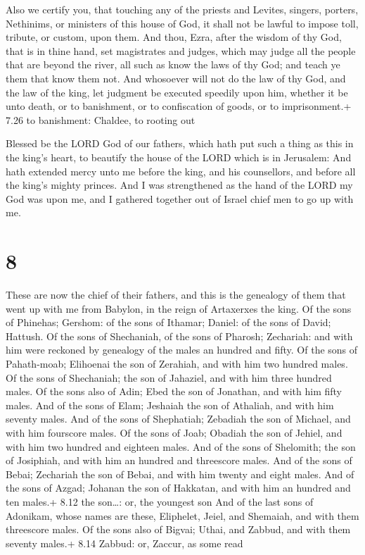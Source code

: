  Also we certify you, that touching any of the priests and
Levites, singers, porters, Nethinims, or ministers of this house of God,
it shall not be lawful to impose toll, tribute, or custom, upon them.
 And thou, Ezra, after the wisdom of thy God, that is in
thine hand, set magistrates and judges, which may judge all the people
that are beyond the river, all such as know the laws of thy God; and
teach ye them that know them not.  And whosoever will not
do the law of thy God, and the law of the king, let judgment be executed
speedily upon him, whether it be unto death, or to banishment, or to
confiscation of goods, or to imprisonment.+ 7.26 to banishment: Chaldee,
to rooting out

 Blessed be the LORD God of our fathers, which hath put
such a thing as this in the king's heart, to beautify the house of the
LORD which is in Jerusalem:  And hath extended mercy unto
me before the king, and his counsellors, and before all the king's
mighty princes. And I was strengthened as the hand of the LORD my God
was upon me, and I gathered together out of Israel chief men to go up
with me.

\hypertarget{section-7}{%
\section{8}\label{section-7}}

 These are now the chief of their fathers, and this is the
genealogy of them that went up with me from Babylon, in the reign of
Artaxerxes the king.  Of the sons of Phinehas; Gershom: of
the sons of Ithamar; Daniel: of the sons of David; Hattush. 
Of the sons of Shechaniah, of the sons of Pharosh; Zechariah: and with
him were reckoned by genealogy of the males an hundred and fifty.
 Of the sons of Pahath-moab; Elihoenai the son of Zerahiah,
and with him two hundred males.  Of the sons of Shechaniah;
the son of Jahaziel, and with him three hundred males.  Of
the sons also of Adin; Ebed the son of Jonathan, and with him fifty
males.  And of the sons of Elam; Jeshaiah the son of
Athaliah, and with him seventy males.  And of the sons of
Shephatiah; Zebadiah the son of Michael, and with him fourscore males.
 Of the sons of Joab; Obadiah the son of Jehiel, and with
him two hundred and eighteen males.  And of the sons of
Shelomith; the son of Josiphiah, and with him an hundred and threescore
males.  And of the sons of Bebai; Zechariah the son of
Bebai, and with him twenty and eight males.  And of the
sons of Azgad; Johanan the son of Hakkatan, and with him an hundred and
ten males.+ 8.12 the son\ldots: or, the youngest son  And
of the last sons of Adonikam, whose names are these, Eliphelet, Jeiel,
and Shemaiah, and with them threescore males.  Of the sons
also of Bigvai; Uthai, and Zabbud, and with them seventy males.+ 8.14
Zabbud: or, Zaccur, as some read

